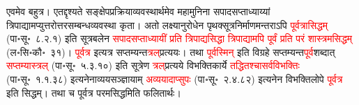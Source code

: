 \begin{sloppypar}\justifying\noindent\hspace{10mm} एवमेव बहुत्र। एतद्दृश्यते सङ्क्षेप\-प्रक्रिया\-व्यवस्थार्थमेव महा\-मुनिना सपाद\-सप्ताध्याय्यां त्रिपाद्यामप्युत्तरोत्तर\-सम्बन्ध\-व्यवस्था कृता। अतो लक्ष्यानुरोधेन पृथक्सूत्र\-निर्माणमन्तराऽपि \textcolor{red}{पूर्वत्रासिद्धम्} (पा॰सू॰~८.२.१) इति सूत्र\-बलेन \textcolor{red}{सपाद\-सप्ताध्यायीं प्रति त्रिपाद्यसिद्धा त्रिपाद्यामपि पूर्वं प्रति परं शास्त्रमसिद्धम्} (ल॰सि॰कौ॰~३१)। \textcolor{red}{पूर्वत्र} इत्यत्र सप्तम्यन्त\-\textcolor{red}{त्रल्‌}\-प्रत्ययः। तथा \textcolor{red}{पूर्वस्मिन्} इति विग्रहे सप्तम्यन्त\-\textcolor{red}{पूर्व}\-शब्दात् \textcolor{red}{सप्तम्यास्त्रल्} (पा॰सू॰~५.३.१०) इति सूत्रेण \textcolor{red}{त्रल्‌}\-प्रत्यये विभक्ति\-कार्ये \textcolor{red}{तद्धितश्चासर्वविभक्तिः} (पा॰सू॰~१.१.३८) इत्यनेनाव्यय\-सञ्ज्ञायाम् \textcolor{red}{अव्ययादाप्सुपः} (पा॰सू॰~२.४.८२) इत्यनेन विभक्ति\-लोपे \textcolor{red}{पूर्वत्र} इति सिद्धम्। तथा च पूर्वत्र परमसिद्धमिति फलितार्थः।

\end{sloppypar}
